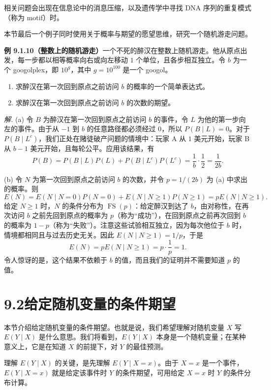 \documentclass[UTF8, 12pt, fontset=fandol, oneside]{ctexart}
\begin{document}
相关问题会出现在信息论中的消息压缩，以及遗传学中寻找 DNA 序列的重复模式（称为 motif）时。

本节最后一个例子同时使用关于概率与期望的愿望思维，研究一个随机游走问题。

\noindent\textbf{例 9.1.10（整数上的随机游走）}\quad 一个不死的醉汉在整数上随机游走。他从原点出发，每一步都以相等概率向右或向左移动 $1$ 个单位，且各步相互独立。令 $b$ 为一个 googolplex，即 $10^g$，其中 $g=10^{100}$ 是一个 googol。
\begin{enumerate}
  \item[(a)] 求醉汉在第一次回到原点之前访问 $b$ 的概率的一个简单表达式。
  \item[(b)] 求醉汉在第一次回到原点之前访问 $b$ 的次数的期望。
\end{enumerate}

\noindent\textit{解.}\quad
(a) 令 $B$ 为醉汉在第一次回到原点之前访问 $b$ 的事件，令 $L$ 为他的第一步向左的事件。由于从 $-1$ 到 $b$ 的任意路径都必须经过 $0$，所以 $P(B\mid L)=0$。对于 $P(B\mid L^c)$，我们正处在赌徒破产问题的情境中：玩家 A 从 $1$ 美元开始，玩家 B 从 $b-1$ 美元开始，且每轮公平。应用该结果，有
\[
  P(B)=P(B\mid L)P(L)+P(B\mid L^c)P(L^c)
  =\frac1b\cdot\frac12=\frac{1}{2b}.
\]

(b) 令 $N$ 为第一次回到原点之前访问 $b$ 的次数，并令 $p=1/(2b)$ 为 (a) 中求出的概率。则
\[
  E(N)=E(N\mid N=0)P(N=0)+E(N\mid N\ge1)P(N\ge1)
  =pE(N\mid N\ge1).
\]
给定 $N\ge1$ 时，$N$ 的条件分布为 $\operatorname{FS}(p)$：给定醉汉到达了 $b$，由对称性，在再次访问 $b$ 之前先回到原点的概率为 $p$（称为“成功”），在回到原点之前再次回到 $b$ 的概率为 $1-p$（称为“失败”）。注意这些试验相互独立，因为每次他位于 $b$ 时，情境都相同且与过去历史无关。因此 $E(N\mid N\ge1)=1/p$，于是
\[
  E(N)=pE(N\mid N\ge1)=p\cdot\frac1p=1.
\]
令人惊讶的是，这个结果不依赖于 $b$ 的值，而且我们的证明并不需要知道 $p$ 的值。

\section*{9.2\quad 给定随机变量的条件期望}

本节介绍给定随机变量的条件期望。也就是说，我们希望理解对随机变量 $X$ 写 $E(Y\mid X)$ 是什么意思。我们将看到，$E(Y\mid X)$ 本身是一个随机变量；在某种意义上，它是在知道 $X$ 的前提下，对 $Y$ 的最佳预测。

理解 $E(Y\mid X)$ 的关键，是先理解 $E(Y\mid X=x)$。由于 $X=x$ 是一个事件，$E(Y\mid X=x)$ 就是给定该事件时 $Y$ 的条件期望，可用给定 $X=x$ 时 $Y$ 的条件分布计算。
\end{document}
